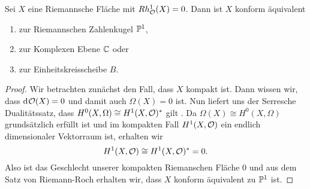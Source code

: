 \begin{thm}
  \label{thm:rmt}
  Sei $X$ eine Riemannsche Fläche mit $Rh_\hol^1(X) = 0$. Dann ist $X$
  konform äquivalent
  \begin{enumerate}
  \item zur Riemannschen Zahlenkugel $\P^1$,
  \item zur Komplexen Ebene $\C$ oder
  \item zur Einheitskreisscheibe $B$.
  \end{enumerate}
\end{thm}

\begin{proof}
  Wir betrachten zunächst den Fall,
  dass $X$ kompakt ist. Dann wissen wir, dass $\d
  \hol(X) = 0$ und damit auch $\Omega(X) = 0$ ist. Nun liefert uns der
  Serresche Dualitätssatz, dass $H^0(X, \Omega) \cong H^1(X,
  \hol)^\ast$ gilt . Da $\Omega(X) \cong H^0(X, \Omega)$ grundsätzlich
  erfüllt ist
  und im kompakten Fall $H^1(X, \hol)$ ein endlich dimensionaler
  Vektorraum ist, erhalten wir
  \[
  H^1(X, \hol) \cong H^1(X, \hol)^\ast = 0.
  \]
  Also ist das Geschlecht unserer kompakten Riemanschen Fläche 0 und
  aus dem Satz von Riemann-Roch erhalten wir, dass $X$ konform
  äquivalent zu $\P^1$ ist.


\end{proof}
